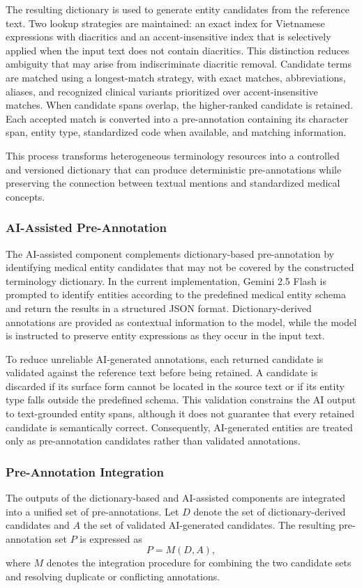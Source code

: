 \documentclass[runningheads]{llncs}
\begin{document}
The resulting dictionary is used to generate entity candidates from the reference text. Two lookup strategies are maintained: an exact index for Vietnamese expressions with diacritics and an accent-insensitive index that is selectively applied when the input text does not contain diacritics. This distinction reduces ambiguity that may arise from indiscriminate diacritic removal. Candidate terms are matched using a longest-match strategy, with exact matches, abbreviations, aliases, and recognized clinical variants prioritized over accent-insensitive matches. When candidate spans overlap, the higher-ranked candidate is retained. Each accepted match is converted into a pre-annotation containing its character span, entity type, standardized code when available, and matching information.

This process transforms heterogeneous terminology resources into a controlled and versioned dictionary that can produce deterministic pre-annotations while preserving the connection between textual mentions and standardized medical concepts.

\subsubsection{AI-Assisted Pre-Annotation}
The AI-assisted component complements dictionary-based pre-annotation by identifying medical entity candidates that may not be covered by the constructed terminology dictionary. In the current implementation, Gemini 2.5 Flash is prompted to identify entities according to the predefined medical entity schema and return the results in a structured JSON format. Dictionary-derived annotations are provided as contextual information to the model, while the model is instructed to preserve entity expressions as they occur in the input text.

To reduce unreliable AI-generated annotations, each returned candidate is validated against the reference text before being retained. A candidate is discarded if its surface form cannot be located in the source text or if its entity type falls outside the predefined schema. This validation constrains the AI output to text-grounded entity spans, although it does not guarantee that every retained candidate is semantically correct. Consequently, AI-generated entities are treated only as pre-annotation candidates rather than validated annotations.

\subsubsection{Pre-Annotation Integration}
The outputs of the dictionary-based and AI-assisted components are integrated into a unified set of pre-annotations. Let $D$ denote the set of dictionary-derived candidates and $A$ the set of validated AI-generated candidates. The resulting pre-annotation set $P$ is expressed as
\[
P = M(D, A),
\]
where $M$ denotes the integration procedure for combining the two candidate sets and resolving duplicate or conflicting annotations.
\end{document}

